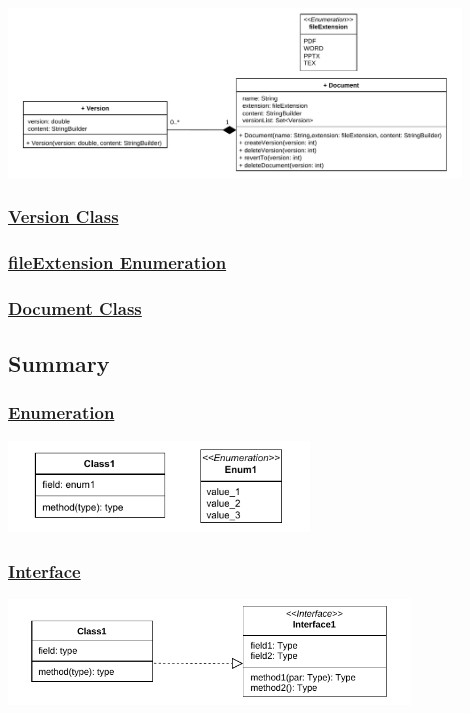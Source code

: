 \begin{center}
\includegraphics[width=0.9\textwidth]{Chapters/Diagram/OOP/EX6/ex6.drawio.pdf}
\end{center}

\subsubsection*{\underline{Version Class}}


\subsubsection*{\underline{fileExtension Enumeration}}


\newpage
\subsubsection*{\underline{Document Class}}


\subsection{Summary}

\subsubsection*{\underline{Enumeration}}
\begin{center}
\includegraphics[width=0.6\textwidth]{Chapters/Diagram/OOP/Sum/Enum/enum.drawio.pdf}
\end{center}

\subsubsection*{\underline{Interface}}
\begin{center}
\includegraphics[width=0.8\textwidth]{Chapters/Diagram/OOP/Sum/Inter/inte.drawio.pdf}
\end{center}

